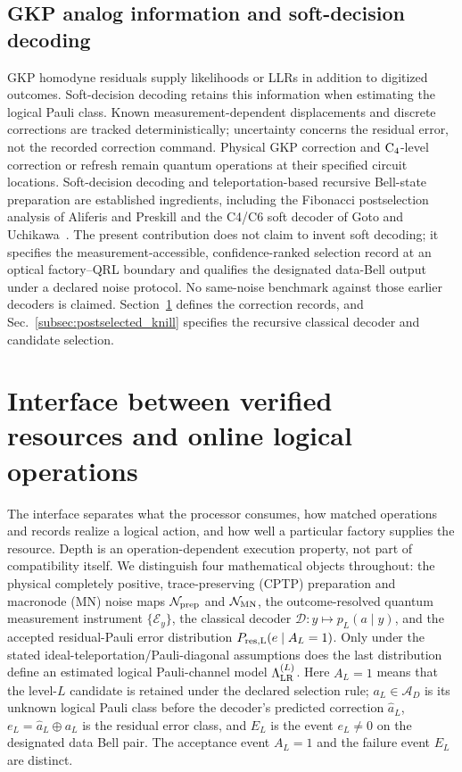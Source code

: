 \documentclass[aps,
prx,
superscriptaddress,
reprint,
longbibliography,
floatfix]{revtex4-2}
\begin{document}
\subsection{GKP analog information and soft-decision decoding}\label{app:softmbqc}
GKP homodyne residuals supply likelihoods or LLRs in addition to digitized outcomes. Soft-decision decoding retains this information when estimating the logical Pauli class. Known measurement-dependent displacements and discrete corrections are tracked deterministically; uncertainty concerns the residual error, not the recorded correction command. Physical GKP correction and ${\rm C_4}$-level correction or refresh remain quantum operations at their specified circuit locations.
Soft-decision decoding and teleportation-based recursive Bell-state preparation are established ingredients, including the Fibonacci postselection analysis of Aliferis and Preskill and the C4/C6 soft decoder of Goto and Uchikawa~\cite{AliferisPreskill2009Fibonacci,GotoUchikawa2013Soft}. The present contribution does not claim to invent soft decoding; it specifies the measurement-accessible, confidence-ranked selection record at an optical factory--QRL boundary and qualifies the designated data-Bell output under a declared noise protocol. No same-noise benchmark against those earlier decoders is claimed. Section~\ref{sec:interface_contract} defines the correction records, and Sec.~\ref{subsec:postselected_knill} specifies the recursive classical decoder and candidate selection.

\section{Interface between verified resources and online logical operations}\label{sec:interface_contract}

The interface separates what the processor consumes, how matched operations and records realize a logical action, and how well a particular factory supplies the resource. Depth is an operation-dependent execution property, not part of compatibility itself.
We distinguish four mathematical objects throughout: the physical completely positive, trace-preserving (CPTP) preparation and macronode (MN) noise maps $\mathcal N_{\rm prep}$ and $\mathcal N_{\rm MN}$, the outcome-resolved quantum measurement instrument $\{\mathcal E_y\}$, the classical decoder $\mathcal D:y\mapsto p_L(a\mid y)$, and the accepted residual-Pauli error distribution $P_{\rm res,L}(e\mid A_L=1)$. Only under the stated ideal-teleportation/Pauli-diagonal assumptions does the last distribution define an estimated logical Pauli-channel model $\Lambda_{\rm LR}^{(L)}$. Here $A_L=1$ means that the level-$L$ candidate is retained under the declared selection rule; $a_L\in\mathcal A_D$ is its unknown logical Pauli class before the decoder's predicted correction $\hat a_L$, $e_L=\hat a_L\oplus a_L$ is the residual error class, and $E_L$ is the event $e_L\ne0$ on the designated data Bell pair. The acceptance event $A_L=1$ and the failure event $E_L$ are distinct.
\end{document}
